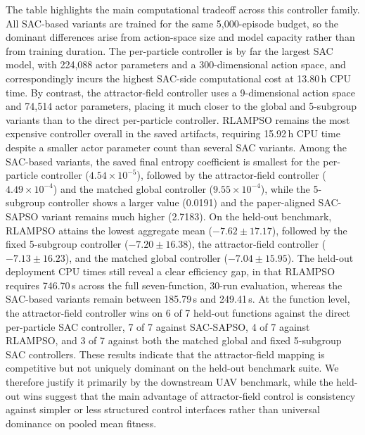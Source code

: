 \documentclass[final,5p,times]{elsarticle}
\begin{document}
The table highlights the main computational tradeoff across this controller family.
All SAC-based variants are trained for the same 5{,}000-episode budget, so the dominant differences arise from action-space size and model capacity rather than from training duration.
The per-particle controller is by far the largest SAC model, with 224{,}088 actor parameters and a 300-dimensional action space, and correspondingly incurs the highest SAC-side computational cost at 13.80\,h CPU time.
By contrast, the attractor-field controller uses a 9-dimensional action space and 74{,}514 actor parameters, placing it much closer to the global and 5-subgroup variants than to the direct per-particle controller.
RLAMPSO remains the most expensive controller overall in the saved artifacts, requiring 15.92\,h CPU time despite a smaller actor parameter count than several SAC variants.
Among the SAC-based variants, the saved final entropy coefficient is smallest for the per-particle controller ($4.54\times 10^{-5}$), followed by the attractor-field controller ($4.49\times 10^{-4}$) and the matched global controller ($9.55\times 10^{-4}$), while the 5-subgroup controller shows a larger value (0.0191) and the paper-aligned SAC-SAPSO variant remains much higher (2.7183).
On the held-out benchmark, RLAMPSO attains the lowest aggregate mean ($-7.62 \pm 17.17$), followed by the fixed 5-subgroup controller ($-7.20 \pm 16.38$), the attractor-field controller ($-7.13 \pm 16.23$), and the matched global controller ($-7.04 \pm 15.95$).
The held-out deployment CPU times still reveal a clear efficiency gap, in that RLAMPSO requires 746.70\,s across the full seven-function, 30-run evaluation, whereas the SAC-based variants remain between 185.79\,s and 249.41\,s.
At the function level, the attractor-field controller wins on 6 of 7 held-out functions against the direct per-particle SAC controller, 7 of 7 against SAC-SAPSO, 4 of 7 against RLAMPSO, and 3 of 7 against both the matched global and fixed 5-subgroup SAC controllers.
These results indicate that the attractor-field mapping is competitive but not uniquely dominant on the held-out benchmark suite. We therefore justify it primarily by the downstream UAV benchmark, while the held-out wins suggest that the main advantage of attractor-field control is consistency against simpler or less structured control interfaces rather than universal dominance on pooled mean fitness.
\end{document}
